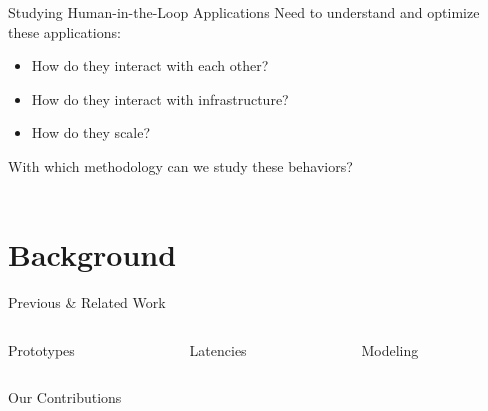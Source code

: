 \documentclass[aspectratio=1610]{beamer}
\begin{document}
\begin{frame}{Studying Human-in-the-Loop Applications}
    Need to understand and optimize these applications:%
    \begin{itemize}
        \item How do they interact with each other?
        \item How do they interact with infrastructure?
        \item How do they scale?
    \end{itemize}%
    \vspace{1em}%
    \begin{center}
        {\Large With which methodology can we study these behaviors?}\\
        \vspace{2em}%
        \\
    \end{center}
\end{frame}

\section{Background}
\begin{frame}[t]{Previous \& Related Work}
    \begin{columns}[onlytextwidth,]
        \begin{column}{.33\linewidth}
            \begin{center}
                \Large%
                Prototypes
            \end{center}
        \end{column}%
        \begin{column}{.33\linewidth}
            \begin{center}
                \Large%
                Latencies
            \end{center}
        \end{column}%
        \begin{column}{.33\linewidth}
            \begin{center}
                \Large%
                Modeling
            \end{center}
        \end{column}%
    \end{columns}
    \begin{block}{Our Contributions}
        \begin{itemize}
        \end{itemize}
    \end{block}
\end{frame}
\end{document}

